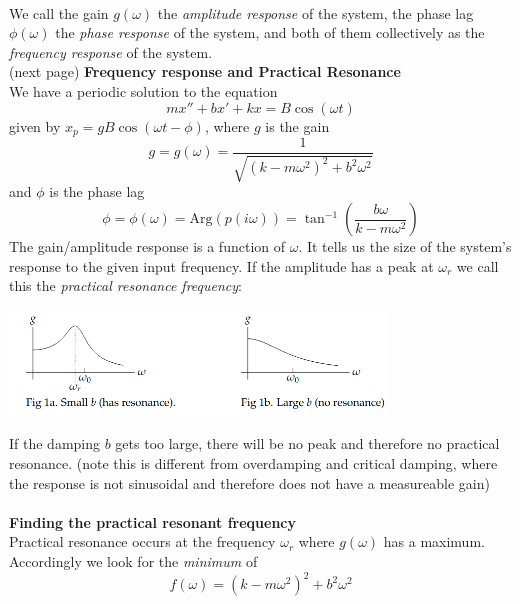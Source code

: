 \documentclass{report}
\begin{document}
\vspace{1mm}\\
We call the gain $g(\omega)$ the \textit{amplitude response} of the system, the phase lag $\phi(\omega)$
the \textit{phase response} of the system, and 
both of them collectively as the \textit{frequency response} of the system.\\
(next page)
\newpage
\noindent\textbf{Frequency response and Practical Resonance}\\
We have a periodic solution to the equation
\begin{equation*}
mx''+bx'+kx=B\cos(\omega t)
\end{equation*}
given by $x_p=gB\cos(\omega t-\phi)$, where $g$ is the gain
\begin{equation*}
g=g(\omega)=\frac{1}{\sqrt{(k-m\omega^2)^2+b^2\omega^2}}
\end{equation*}
and $\phi$ is the phase lag
\begin{equation*}
\phi=\phi(\omega)=\text{Arg}(p(i\omega))=\tan^{-1}\left(\frac{b\omega}{k-m\omega^2}\right)
\end{equation*}
The gain/amplitude response is a function of $\omega$. It tells us the size of the system's response to the
given input frequency. If the amplitude has a peak at $\omega_r$ we call this the \textit{practical
resonance frequency}:
\begin{center}
\includegraphics[width=10cm]{34}\\
\end{center}
If the damping $b$ gets too large, there will be no peak and therefore no practical resonance. 
(note this is different from overdamping and critical damping, where the response is not sinusoidal and therefore
does not have a measureable gain)\\
\vspace{1mm}\\
\textbf{Finding the practical resonant frequency}\\
Practical resonance occurs at the frequency $\omega_r$ where $g(\omega)$ has a maximum. Accordingly we look for the
\textit{minimum} of 
\begin{equation*}
f(\omega)=(k-m\omega^2)^2+b^2\omega^2
\end{equation*}
\end{document}
